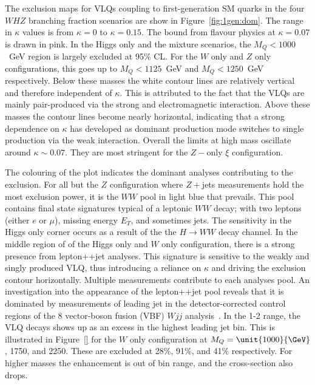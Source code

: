 The exclusion maps for VLQs coupling to first-generation SM quarks in the four $WHZ$ branching fraction scenarios are show in Figure~\ref{fig:1gen:dom}. The range in $\kappa$ values is from $\kappa=0$ to $\kappa=0.15$. The bound from flavour physics at $\kappa=0.07$ is drawn in pink. In the Higgs only and the mixture scenarios, the $M_Q<1000$~GeV region is largely excluded at 95\% CL. For the $W$ only and $Z$ only configurations, this goes up to $M_Q<1125$~GeV and $M_Q<1250$~GeV respectively. Below these masses the white contour lines are relatively vertical and therefore independent of $\kappa$. This is attributed to the fact that the VLQs are mainly pair-produced via the strong and electromagnetic interaction. Above these masses the contour lines become nearly horizontal, indicating that a strong dependence on $\kappa$ has developed as dominant production mode switches to single production via the weak interaction. Overall the limits at high mass oscillate around $\kappa\sim 0.07$. They are most stringent for the $Z-$only $\xi$ configuration. 

The colouring of the plot indicates the dominant analyses contributing to the exclusion. For all but the $Z$ configuration where $Z+$jets measurements hold the most exclusion power, it is the \ATLAS $WW$ pool in light blue that prevails. This pool contains final state signatures typical of a leptonic $WW$ decay; with two leptons (either $e$ or $\mu$), missing energy $E_T$, and sometimes jets. The sensitivity in the Higgs only corner occurs as a result of the the $H\rightarrow WW$ decay channel. In the middle region of of the Higgs only and $W$ only configuration, there is a strong presence from \ATLAS lepton+\MET{}+jet analyses. This signature is sensitive to the weakly and singly produced VLQ, thus introducing a reliance on $\kappa$ and driving the exclusion contour horizontally. Multiple measurements contribute to each analyses pool. An investigation into the appearance of the lepton+\MET{}+jet pool reveals that it is dominated by measurements of leading jet \pT in the detector-corrected control regions of the \unit{8}{\TeV} \ATLAS vector-boson fusion (VBF) $Wjj$ analysis~\cite{Aaboud:2017fye}. In the \unit{1}{\TeV}-\unit{2}{\TeV} range, the VLQ decays shows up as an excess in the highest leading jet \pT bin. This is illustrated in Figure~\ref{} for the $W$ only configuration at $M_Q=\unit{1000}{\GeV}$, \unit{1750}{\GeV}, and \unit{2250}{\GeV}. These are excluded at 28\%, 91\%, and 41\% respectively. For higher masses the enhancement is out of bin range, and the cross-section also drops. 

